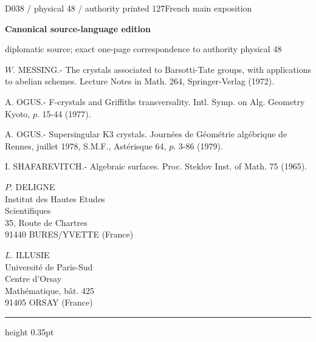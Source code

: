 \documentclass[9pt]{article}
\newcommand{\CanonText}[1]{\par{\fontsize{8.0}{9.35}\selectfont\RaggedRight #1\par}\vspace{2.2pt}}
\newcommand{\LayerTitle}{Canonical source-language edition}
\begin{document}
\noindent\begin{minipage}[t][\dimexpr\textheight-5pt\relax][t]{\textwidth}
{\sffamily\fontsize{7.3}{8.2}\selectfont\color{Quiet} D038 / physical 48 / authority printed 127\hfill French main exposition}
\par{}\vspace{4.5pt}
{\sffamily\fontsize{10.4}{11.6}\selectfont\bfseries\color{Accent} \LayerTitle}
\par{\sffamily\fontsize{6.7}{7.7}\selectfont\color{Quiet} diplomatic source; exact one-page correspondence to authority physical 48}
\vspace{5pt}
\CanonText{[14] \(W\). MESSING.- The crystals associated to Barsotti-Tate groups, with applications to abelian schemes. Lecture Notes in Math. 264, Springer-Verlag (1972).}
\CanonText{[15] A. OGUS.- F-crystals and Griffiths transversality. Intl. Symp. on Alg. Geometry Kyoto, \(p\). 15-44 (1977).}
\CanonText{[16] A. OGUS.- Supersingular K3 crystals. Journées de Géométrie algébrique de Rennes, juillet 1978, S.M.F., Astérisque 64, \(p\). 3-86 (1979).}
\CanonText{[17] I. SHAFAREVITCH.- Algebraic surfaces. Proc. Steklov Inst. of Math. 75 (1965).}
\CanonText{\(P\). DELIGNE\\Institut des Hautes Etudes\\Scientifiques\\35, Route de Chartres\\91440 BURES/YVETTE (France)}
\CanonText{\(L\). ILLUSIE\\Université de Paris-Sud\\Centre d'Orsay\\Mathématique, bât. 425\\91405 ORSAY (France)}
\vfill
{\color{Accent}\hrule height 0.35pt}\vspace{3pt}
\end{minipage}
\newpage
\end{document}

